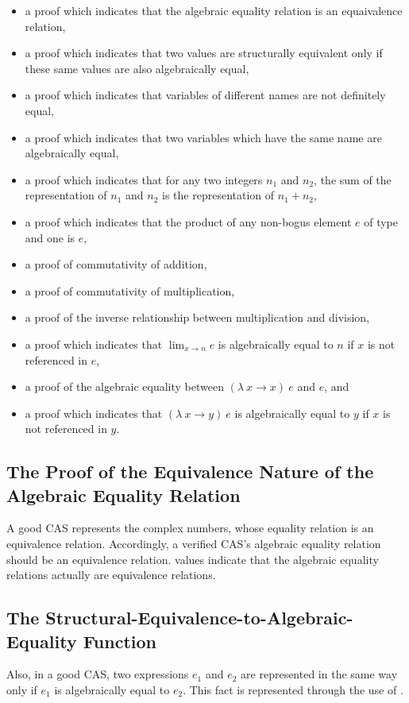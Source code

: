 \documentclass{report}
\begin{document}
\begin{itemize}
 \item a proof which indicates that the algebraic equality relation is an equaivalence relation,
 \item a proof which indicates that two values are structurally equivalent only if these same values are also algebraically equal,
 \item a proof which indicates that variables of different names are not definitely equal,
 \item a proof which indicates that two variables which have the same name are algebraically equal,
 \item a proof which indicates that for any two integers \(n_1\) and \(n_2\), the sum of the representation of \(n_1\) and \(n_2\) is the representation of \(n_1 + n_2\),
 \item a proof which indicates that the product of any non-bogus element \(e\) of type  and one is \(e\),
 \item a proof of commutativity of addition,
 \item a proof of commutativity of multiplication,
 \item a proof of the inverse relationship between multiplication and division,
 \item a proof which indicates that \(\lim_{x \rightarrow n} e\) is algebraically equal to \(n\) if \(x\) is not referenced in \(e\),
 \item a proof of the algebraic equality between \(\left(\lambda\ x \rightarrow x\right)\ e\) and \(e\), and
 \item a proof which indicates that \(\left(\lambda\ x \rightarrow y\right)\ e\) is algebraically equal to \(y\) if \(x\) is not referenced in \(y\).
\end{itemize}

\subsection{The Proof of the Equivalence Nature of the Algebraic Equality Relation}
A good CAS represents the complex numbers, whose equality relation is an equivalence relation.  Accordingly, a verified CAS's algebraic equality relation should be an equivalence relation.   values indicate that the algebraic equality relations actually are equivalence relations.

\subsection{The Structural-Equivalence-to-Algebraic-Equality Function}
Also, in a good CAS, two expressions \(e_1\) and \(e_2\) are represented in the same way only if \(e_1\) is algebraically equal to \(e_2\).  This fact is represented through the use of .
\end{document}
